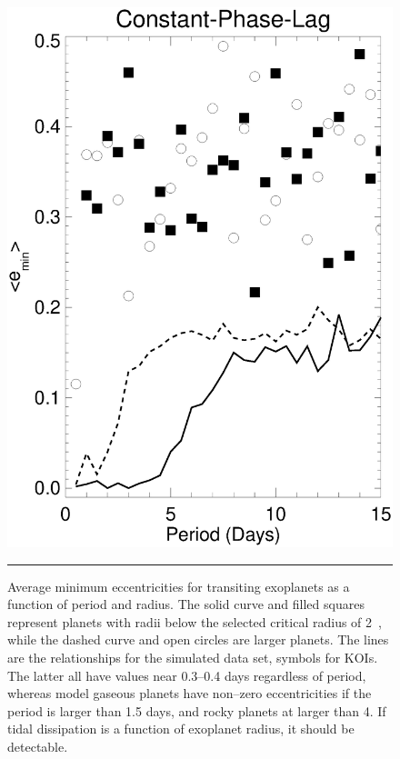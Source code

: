 \begin{figure}[t] 
  \begin{minipage}[c]{0.39\textwidth}
    \includegraphics[width=\textwidth]{figures/compare.emin2.ps}
  \end{minipage}\hfill
  \begin{minipage}[c]{0.6\textwidth}

    \caption{Average minimum eccentricities for transiting exoplanets
  as a function of period and radius.  The solid curve and filled
  squares represent planets with radii below the selected critical
  radius of 2~\rearth, while the dashed curve and open circles are
  larger planets. The lines are the relationships for the simulated
  data set, symbols for KOIs. The latter all have values near 0.3--0.4
  days regardless of period, whereas model gaseous planets have
  non--zero eccentricities if the period is larger than 1.5 days, and
  rocky planets at larger than 4. If tidal dissipation is a function
  of exoplanet radius, it should be detectable. }

    \label{fig:emin}
    \hspace*{\fill}  
    \hrule
  \end{minipage}
\end{figure}

